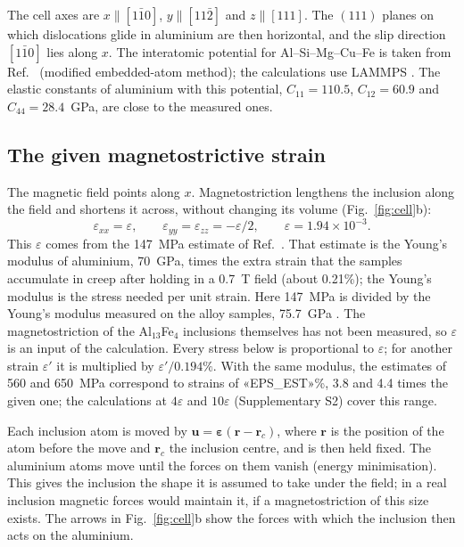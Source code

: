 \documentclass[11pt,a4paper]{article}
\begin{document}
The cell axes are $x\parallel[1\bar10]$, $y\parallel[11\bar2]$ and
$z\parallel[111]$. The $(111)$ planes on which dislocations glide in
aluminium are then horizontal, and the slip direction $[1\bar10]$ lies along
$x$. The interatomic potential for Al--Si--Mg--Cu--Fe is taken from
Ref.~\cite{Jelinek2012} (modified embedded-atom method); the calculations use
LAMMPS \cite{Thompson2022LAMMPS}. The elastic constants of aluminium with
this potential, $C_{11}=110.5$, $C_{12}=60.9$ and $C_{44}=28.4$~GPa, are close
to the measured ones.

\subsection{The given magnetostrictive strain}
\label{sec:strain}

The magnetic field points along $x$. Magnetostriction lengthens the inclusion
along the field and shortens it across, without changing its volume
(Fig.~\ref{fig:cell}b):
\begin{equation}
\varepsilon_{xx}=\varepsilon,\qquad
\varepsilon_{yy}=\varepsilon_{zz}=-\varepsilon/2,\qquad
\varepsilon=1.94\times10^{-3}.
\label{eq:strain}
\end{equation}
This $\varepsilon$ comes from the 147~MPa estimate of Ref.~\cite{Friha2024JMMM}.
That estimate is the Young's modulus of aluminium, 70~GPa, times the extra
strain that the samples accumulate in creep after holding in a 0.7~T field
(about 0.21\%); the Young's modulus is the stress needed per unit strain.
Here 147~MPa is divided by the Young's modulus measured on the alloy
samples, 75.7~GPa \cite{Pshonkin2025ZL}. The magnetostriction of the
Al$_{13}$Fe$_4$ inclusions themselves has not been measured, so
$\varepsilon$ is an input of the calculation. Every stress below is
proportional to $\varepsilon$; for another strain $\varepsilon'$ it is
multiplied by $\varepsilon'/0.194\%$. With the same modulus, the estimates
of 560 and 650~MPa \cite{Skvortsov2019JAP,Friha2023PSS} correspond to
strains of «EPS_EST»\%, 3.8 and 4.4 times the given one; the calculations at
$4\varepsilon$ and $10\varepsilon$ (Supplementary S2) cover this range.

Each inclusion atom is moved by
$\mathbf u=\boldsymbol\varepsilon(\mathbf r-\mathbf r_c)$, where $\mathbf r$ is
the position of the atom before the move and $\mathbf r_c$ the inclusion
centre, and is then held fixed. The aluminium atoms move until the forces on
them vanish (energy minimisation). This gives the inclusion the shape it is
assumed to take under the field; in a real inclusion magnetic forces would
maintain it, if a magnetostriction of this size exists. The arrows in
Fig.~\ref{fig:cell}b show the forces with which the inclusion then acts on
the aluminium.
\end{document}
